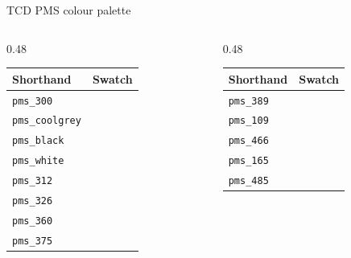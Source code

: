 \documentclass[aspectratio=169]{beamer}
\begin{document}
\begin{frame}{TCD PMS colour palette}
\small
\renewcommand{\arraystretch}{1.3}
\begin{columns}[t]
  \begin{column}{0.48\textwidth}
    \begin{tabular}{ll}
      \toprule
      \textbf{Shorthand} & \textbf{Swatch} \\
      \midrule
      \texttt{pms\_300}      & \cellcolor{pms_300}\hspace{2cm} \\
      \texttt{pms\_coolgrey} & \cellcolor{pms_coolgrey}\hspace{2cm} \\
      \texttt{pms\_black}    & \cellcolor{pms_black}\hspace{2cm} \\
      \texttt{pms\_white}    & \cellcolor{pms_white}\hspace{2cm} \\
      \texttt{pms\_312}      & \cellcolor{pms_312}\hspace{2cm} \\
      \texttt{pms\_326}      & \cellcolor{pms_326}\hspace{2cm} \\
      \texttt{pms\_360}      & \cellcolor{pms_360}\hspace{2cm} \\
      \texttt{pms\_375}      & \cellcolor{pms_375}\hspace{2cm} \\
      \bottomrule
    \end{tabular}
  \end{column}
  \begin{column}{0.48\textwidth}
    \begin{tabular}{ll}
      \toprule
      \textbf{Shorthand} & \textbf{Swatch} \\
      \midrule
      \texttt{pms\_389}      & \cellcolor{pms_389}\hspace{2cm} \\
      \texttt{pms\_109}      & \cellcolor{pms_109}\hspace{2cm} \\
      \texttt{pms\_466}      & \cellcolor{pms_466}\hspace{2cm} \\
      \texttt{pms\_165}      & \cellcolor{pms_165}\hspace{2cm} \\
      \texttt{pms\_485}      & \cellcolor{pms_485}\hspace{2cm} \\

\end{tabular}
\end{column}
\end{columns}
\end{frame}
\end{document}

